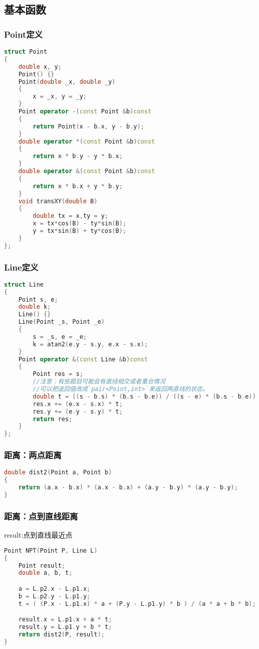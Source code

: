 \subsection{基本函数}
    \subsubsection{Point定义}
        \begin{lstlisting}[language=c++]
struct Point
{
    double x, y;
    Point() {}
    Point(double _x, double _y)
    {
        x = _x, y = _y;
    }
    Point operator -(const Point &b)const
    {
        return Point(x - b.x, y - b.y);
    }
    double operator *(const Point &b)const
    {
        return x * b.y - y * b.x;
    }
    double operator &(const Point &b)const
    {
        return x * b.x + y * b.y;
    }
    void transXY(double B)
    {
        double tx = x,ty = y;
        x = tx*cos(B) - ty*sin(B);
        y = tx*sin(B) + ty*cos(B);
    }
};
        \end{lstlisting}
        
    \subsubsection{Line定义}
        \begin{lstlisting}[language=c++]
struct Line
{
    Point s, e;
    double k;
    Line() {}
    Line(Point _s, Point _e)
    {
        s = _s, e = _e;
        k = atan2(e.y - s.y, e.x - s.x);
    }
    Point operator &(const Line &b)const
    {
        Point res = s;
        //注意：有些题目可能会有直线相交或者重合情况
        //可以把返回值改成`pair<Point,int>`来返回两直线的状态。
        double t = ((s - b.s) * (b.s - b.e)) / ((s - e) * (b.s - b.e));
        res.x += (e.x - s.x) * t;
        res.y += (e.y - s.y) * t;
        return res;
    }
};
        \end{lstlisting}
        
    \subsubsection{距离：两点距离}
        \begin{lstlisting}[language=c++]
double dist2(Point a, Point b)
{
    return (a.x - b.x) * (a.x - b.x) + (a.y - b.y) * (a.y - b.y);
}
        \end{lstlisting}
        
    \subsubsection{距离：点到直线距离}
	result:点到直线最近点
	\begin{lstlisting}[language=c++]
Point NPT(Point P, Line L)  
{ 
    Point result; 
    double a, b, t; 

    a = L.p2.x - L.p1.x; 
    b = L.p2.y - L.p1.y; 
    t = ( (P.x - L.p1.x) * a + (P.y - L.p1.y) * b ) / (a * a + b * b); 

    result.x = L.p1.x + a * t; 
    result.y = L.p1.y + b * t; 
    return dist2(P, result); 
}
	\end{lstlisting}
	
